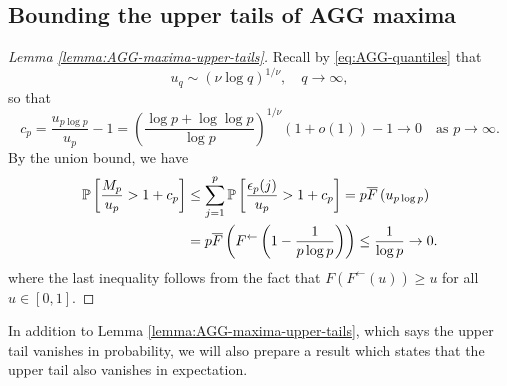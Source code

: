\subsection{Bounding the upper tails of AGG maxima}
\label{subsec:bounding-upper-tails-of-maxima}


\begin{proof}[Lemma \ref{lemma:AGG-maxima-upper-tails}]
Recall by \eqref{eq:AGG-quantiles} that 
\begin{equation*}
    u_q\sim\left(\nu\log{q}\right)^{1/\nu}, \quad q\to\infty,
\end{equation*}
so that
\begin{equation} %
c_p  = \frac{u_{p\log{p}}}{u_p} -1 = \left(\frac{\log{p}+\log{\log{p}}}{\log{p}}\right)^{1/\nu}(1+o(1)) - 1 \rightarrow 0 \quad \mbox{as } p\to\infty.
\end{equation} 
By the union bound, we have
\begin{align}
    \P\left[\frac{M_p}{u_p} > 1+c_p\right] 
        &\le \sum_{j=1}^p \P\left[\frac{\epsilon_p(j)}{u_p} > 1+c_p\right] 
        = p \overline{F}\left(u_{p\log{p}}\right) \label{eq:AGG-maxima-upper-tails-proof-1} \\
        &= p \overline{F}\left(F^{\leftarrow}\left(1-\frac{1}{p\log{p}}\right)\right) \le \frac{1}{\log{p}} \rightarrow 0. \nonumber
\end{align}
where the last inequality follows from the fact that $F\left(F^{\leftarrow}(u)\right)\ge u$ for all $u\in[0,1]$.
\end{proof}

In addition to Lemma \ref{lemma:AGG-maxima-upper-tails}, which says the upper tail vanishes in probability, we will also prepare a result which states that the upper tail also vanishes in expectation.


